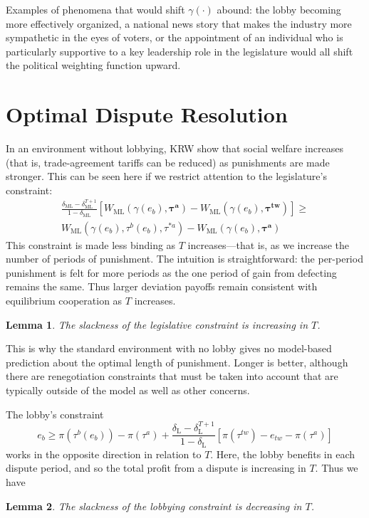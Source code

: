 \documentclass[authoryear, review]{elsarticle}
\newtheorem{lemma}{Lemma}
\newcommand{\bta}{\bm{\tau^a}}
\newcommand{\ga}{\gamma}
\newcommand{\btw}{\bm{\tau^{tw}}}
\newcommand{\de}{\delta}
\begin{document}
Examples of phenomena that would shift $\ga(\cdot)$ abound: the lobby becoming more effectively organized, a national news story that makes the industry more sympathetic in the eyes of voters, or the appointment of an individual who is particularly supportive to a key leadership role in the legislature would all shift the political weighting function upward.

\section{Optimal Dispute Resolution}
\label{sec:optimal}
In an environment without lobbying, KRW show that social welfare increases (that is, trade-agreement tariffs can be reduced) as punishments are made stronger. This can be seen here if we restrict attention to the legislature's constraint:
\begin{multline*}
  \frac{\de_\text{ML} - \de_\text{ML}^{T+1}}{1-\de_\text{ML}} \left[W_\text{ML}(\ga(e_b),\bta) - W_\text{ML}(\ga(e_b),\btw) \right] \geq \\
	W_\text{ML}(\ga(e_b),\tau^b(e_b),\tau^{*a}) - W_\text{ML}(\ga(e_b),\bta)
\end{multline*}
This constraint is made less binding as $T$ increases---that is, as we increase the number of periods of punishment. The intuition is straightforward: the per-period punishment is felt for more periods as the one period of gain from defecting remains the same. Thus larger deviation payoffs remain consistent with equilibrium cooperation as $T$ increases.
\begin{lemma}
  The slackness of the legislative constraint is increasing in $T$.
  \label{lem:legcon}
\end{lemma}
This is why the standard environment with no lobby gives no model-based prediction about the optimal length of punishment. Longer is better, although there are renegotiation constraints that must be taken into account that are typically outside of the model as well as other concerns.

The lobby's constraint
\[
  e_b \geq \pi(\tau^b(e_b)) - \pi(\tau^a) + \frac{\de_\text{L} - \de_\text{L}^{T+1}}{1-\de_\text{L}} \left[\pi(\tau^{tw}) - e_{tw} -\pi(\tau^a) \right]
\]
works in the opposite direction in relation to $T$. Here, the lobby benefits in each dispute period, and so the total profit from a dispute is increasing in $T$. Thus we have
\begin{lemma}
  The slackness of the lobbying constraint is decreasing in $T$.
  \label{lem:lobcon}
\end{lemma}
\end{document}
